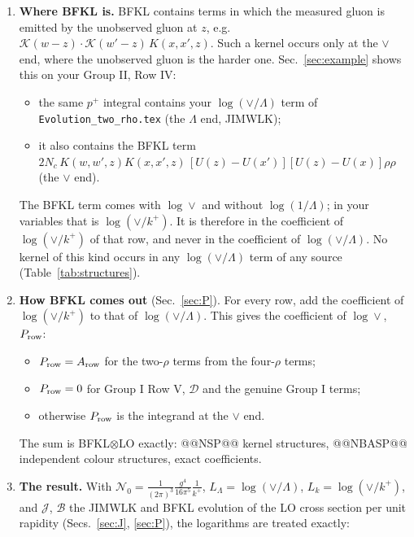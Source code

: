 \documentclass[10pt]{article}
\numberwithin{equation}{section}
\newcommand{\KK}{\mathcal K}
\newcommand{\NO}{\mathcal N_0}
\newcommand{\LL}{L_\Lambda}
\newcommand{\Lk}{L_k}
\newcommand{\J}{\mathcal J}
\newcommand{\B}{\mathcal B}
\newcommand{\T}{\mathfrak T}
\newcommand{\PP}{\mathfrak P}
\begin{document}
\begin{enumerate}
\begin{itemize}
\end{itemize}
Integrating out a gluon softer than the measured gluon is one step of the evolution of the target: JIMWLK. A row is an exact identity of the form $\T\log(\vee/\Lambda)+(\PP-\T)\log(\vee/k^+)+R$, with $\T$ ($\PP$) the integrand at the $\Lambda$ ($\vee$) end and $R$ free of both logarithms. The coefficients are unique (Sec.~\ref{sec:exact}).
\item \textbf{Where BFKL is.} BFKL contains terms in which the measured gluon is emitted by the unobserved gluon at $z$, e.g.\ $\KK(w-z)\cdot\KK(w'-z)\,K(x,x',z)$. Such a kernel occurs only at the $\vee$ end, where the unobserved gluon is the harder one. Sec.~\ref{sec:example} shows this on your Group II, Row IV:
\begin{itemize}
\item the same $p^+$ integral contains your $\log(\vee/\Lambda)$ term of \texttt{Evolution\_two\_rho.tex} (the $\Lambda$ end, JIMWLK);
\item it also contains the BFKL term $2N_c\,K(w,w',z)K(x,x',z)\,[U(z)-U(x')][U(z)-U(x)]\rho\rho$ (the $\vee$ end).
\end{itemize}
The BFKL term comes with $\log\vee$ and without $\log(1/\Lambda)$; in your variables that is $\log(\vee/k^+)$. It is therefore in the coefficient of $\log(\vee/k^+)$ of that row, and never in the coefficient of $\log(\vee/\Lambda)$. No kernel of this kind occurs in any $\log(\vee/\Lambda)$ term of any source (Table~\ref{tab:structures}).
\item \textbf{How BFKL comes out} (Sec.~\ref{sec:P}). For every row, add the coefficient of $\log(\vee/k^+)$ to that of $\log(\vee/\Lambda)$. This gives the coefficient of $\log\vee$, $P_{\rm row}$:
\begin{itemize}
\item $P_{\rm row}=A_{\rm row}$ for the two-$\rho$ terms from the four-$\rho$ terms;
\item $P_{\rm row}=0$ for Group I Row V, $\mathcal D$ and the genuine Group I terms;
\item otherwise $P_{\rm row}$ is the integrand at the $\vee$ end.
\end{itemize}
The sum is BFKL$\otimes$LO exactly: @@NSP@@ kernel structures, @@NBASP@@ independent colour structures, exact coefficients.
\item \textbf{The result.} With $\NO=\frac{1}{(2\pi)^3}\frac{g^4}{16\pi^5}\frac1{k^+}$, $\LL=\log(\vee/\Lambda)$, $\Lk=\log(\vee/k^+)$, and $\J$, $\B$ the JIMWLK and BFKL evolution of the LO cross section per unit rapidity (Secs.~\ref{sec:J}, \ref{sec:P}), the logarithms are treated exactly:

\end{enumerate}
\end{document}
